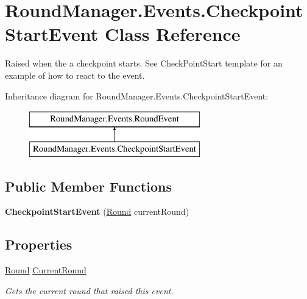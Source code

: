 \hypertarget{class_round_manager_1_1_events_1_1_checkpoint_start_event}{}\section{Round\+Manager.\+Events.\+Checkpoint\+Start\+Event Class Reference}
\label{class_round_manager_1_1_events_1_1_checkpoint_start_event}


Raised when the a checkpoint starts. See Check\+Point\+Start template for an example of how to react to the event.  


Inheritance diagram for Round\+Manager.\+Events.\+Checkpoint\+Start\+Event\+:\begin{figure}[H]
\begin{center}
\leavevmode
\includegraphics[height=2.000000cm]{class_round_manager_1_1_events_1_1_checkpoint_start_event}
\end{center}
\end{figure}
\subsection*{Public Member Functions}
\begin{DoxyCompactItemize}
\item 
\hypertarget{class_round_manager_1_1_events_1_1_checkpoint_start_event_a5e4f62f93c1f4add24bd2fd6fbd554ea}{}{\bfseries Checkpoint\+Start\+Event} (\hyperlink{class_round_manager_1_1_round}{Round} current\+Round)\label{class_round_manager_1_1_events_1_1_checkpoint_start_event_a5e4f62f93c1f4add24bd2fd6fbd554ea}

\end{DoxyCompactItemize}
\subsection*{Properties}
\begin{DoxyCompactItemize}
\item 
\hyperlink{class_round_manager_1_1_round}{Round} \hyperlink{class_round_manager_1_1_events_1_1_checkpoint_start_event_aef6965be346eb340a052b5cea470a041}{Current\+Round}
\begin{DoxyCompactList}\small\item\em Gets the current round that raised this event. \end{DoxyCompactList}\end{DoxyCompactItemize}


